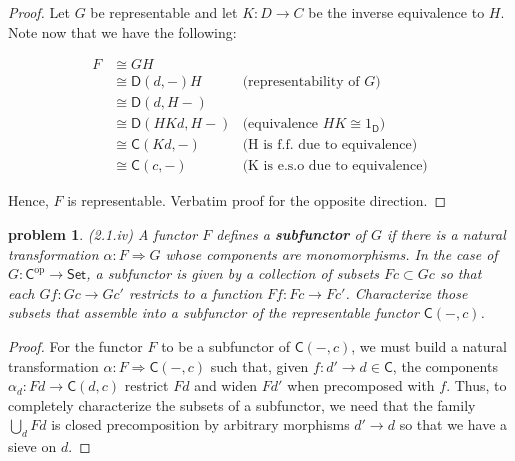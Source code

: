 \documentclass[10pt, oneside]{article}   	%
\newcommand{\cat}[1]{\mathsf{#1}}
\newcommand{\cc}{\cat{C}}
\newcommand{\dd}{\cat{D}}
\newcommand{\cset}{\cat{Set}}
\newcommand{\op}[1]{#1^{\text{op}}}
\newcommand{\opc}{\op{\cc}}
\newcommand{\nt}{\Rightarrow}
\newtheorem{problem}[theorem]{problem}
\begin{document}
\begin{proof}
Let $G$ be representable and let $K : D \to C$ be the inverse equivalence to $H$. Note now that we have the following: 
	
\begin{center}
\begin{equation}
	\begin{aligned}
		F &\cong GH \\
		 &\cong \dd(d, -)H & \text{(representability of $G$)} \\
		 &\cong \dd(d, H-)  \\ 
		 &\cong \dd(HKd, H-) & \text{(equivalence $HK \cong 1_\dd$)} \\
		 &\cong \cc(Kd, -) & \text{(H is f.f. due to equivalence)} \\
		 &\cong \cc(c, -) & \text{(K is e.s.o due to equivalence)}
	\end{aligned}
\end{equation}
\end{center}

Hence, $F$ is representable. Verbatim proof for the opposite direction.
\end{proof}
	
\begin{problem} (2.1.iv) A functor $F$ defines a \textbf{subfunctor} of $G$ if there is a natural transformation $\alpha: F \nt G$ whose components are monomorphisms. In the case of $G: \opc \to \cset$, a subfunctor is given by a collection of subsets $Fc \subset Gc$ so that each $Gf : Gc \to Gc'$ restricts to a function $Ff : Fc \to Fc'$. Characterize those subsets that assemble into a subfunctor of the representable functor $\cc(-, c)$.

\end{problem}

\begin{proof}

For the functor $F$ to be a subfunctor of $\cc(-, c)$, we must build a natural transformation $\alpha : F \nt \cc(-, c)$ such that, given $f : d' \to d \in \cc$,  the components $\alpha_d : Fd \to \cc(d, c)$ restrict $Fd$ and widen $Fd'$ when precomposed with $f$. Thus, to completely characterize the subsets of a subfunctor, we need that the family $\bigcup_d Fd$ is closed precomposition by arbitrary morphisms $d' \to d$ so that we have a sieve on $d$.
\end{proof} 
\end{document}
